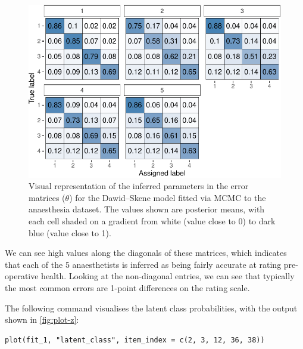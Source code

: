 \begin{figure}

{\centering \includegraphics{RJ-2023-064_files/figure-latex/plot-theta-1} 

}

\caption{Visual representation of the inferred parameters in the error matrices ($\theta$) for the Dawid--Skene model fitted via MCMC to the anaesthesia dataset. The values shown are posterior means, with each cell shaded on a gradient from white (value close to 0) to dark blue (value close to 1).}\label{fig:plot-theta}
\end{figure}

We can see high values along the diagonals of these matrices, which indicates
that each of the 5 anaesthetists is inferred as being fairly accurate at rating
pre-operative health. Looking at the non-diagonal entries, we can see that
typically the most common errors are 1-point differences on the rating scale.

The following command visualises the latent class probabilities, with the
output shown in \autoref{fig:plot-z}:

\begin{verbatim}
plot(fit_1, "latent_class", item_index = c(2, 3, 12, 36, 38))
\end{verbatim}

